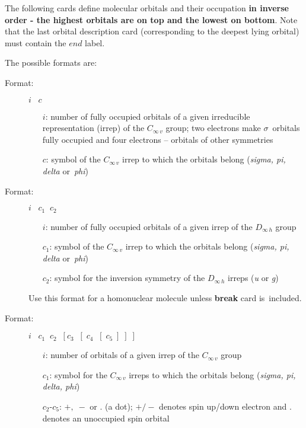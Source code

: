 \documentclass[12pt,a4paper]{article}
\begin{document}
\begin{description}
The following cards define molecular orbitals and their occupation
{\bf in inverse order - the highest orbitals are on top and the lowest
  on bottom}. Note that the last orbital description card
(corresponding to the deepest lying orbital) must contain the $end$
label.

The possible formats are:
\begin{description}
\item[Format:] $i\;\;\;c$
\begin{itemize}
\item[$i$:] number of fully occupied orbitals of a given irreducible
     representation (irrep) of the $C_{\infty\,v}$ group;
	two electrons make $\sigma$~orbitals fully occupied
     and four electrons -- orbitals of other symmetries
\item[$c$:] symbol of the $C_{\infty\,v}$ irrep to which the orbitals
     belong ({\it sigma, pi, delta} or~{\it phi})
\end{itemize}
\end{description}


\begin{description}
\item[Format:] $i\;\;\;c_1 \;\;c_2$
\begin{itemize}
\item[$i$:] number of fully occupied orbitals of a given irrep of the
$D_{\infty\,h}$ group
\item[$c_1$:] symbol of the $C_{\infty\,v}$ irrep to which the orbitals belong
       ({\it sigma, pi, delta} or~{\it phi})
\item[$c_2$:] symbol for the inversion symmetry of the $D_{\infty\,h}$ irreps
       ({\it u} or {\it g})
\end{itemize}
Use this format for a homonuclear molecule unless \textbf{break} card
is~included.
\end{description}


\begin{description}
\item[Format:]
$i\;\;\;c_1\;\;c_2\;\;[c_3\;\;[\;c_4\;\;[\;c_5\;]\;]\;]$
\begin{itemize}
\item[$i$:] number of orbitals of a given irrep of the $C_{\infty\,v}$  group
\item[$c_1$:] symbol for the $C_{\infty\,v}$ irreps to which the
orbitals belong ({\it sigma, pi, delta, phi})
\item[$c_2$-$c_5$:] $+,\;-$ or . (a dot); $+/-$ denotes spin up/down
electron and . denotes an unoccupied spin orbital
\end{itemize}
\end{description}


\end{description}
\end{document}
